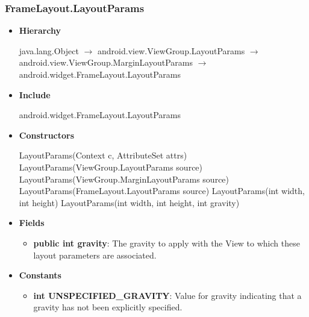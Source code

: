 \documentclass{report}
\begin{document}
    \subsubsection{FrameLayout.LayoutParams}
    \begin{itemize}
        \item \textbf{Hierarchy}        
            \begin{center}
                java.lang.Object $\to$	android.view.ViewGroup.LayoutParams $\to$	android.view.ViewGroup.MarginLayoutParams $\to$	android.widget.FrameLayout.LayoutParams
            \end{center}
        \item \textbf{Include}
            \bigbreak \noindent 
            \begin{javacode}
                android.widget.FrameLayout.LayoutParams
            \end{javacode}
        \item \textbf{Constructors}
            \bigbreak \noindent 
            \begin{javacode}
                LayoutParams(Context c, AttributeSet attrs)
                LayoutParams(ViewGroup.LayoutParams source)
                LayoutParams(ViewGroup.MarginLayoutParams source)
                LayoutParams(FrameLayout.LayoutParams source)
                LayoutParams(int width, int height)
                LayoutParams(int width, int height, int gravity)
            \end{javacode}
        \item \textbf{Fields}
            \begin{itemize}
                \item \textbf{public int gravity}: The gravity to apply with the View to which these layout parameters are associated.
            \end{itemize}
        \item \textbf{Constants}
            \begin{itemize}
                \item \textbf{int UNSPECIFIED\_GRAVITY}: Value for gravity indicating that a gravity has not been explicitly specified.
            \end{itemize}
    \end{itemize}

    \pagebreak 
\end{document}
